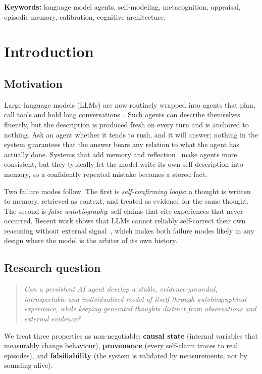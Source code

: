 \documentclass[11pt]{article}
\begin{document}
\vspace{4pt}\noindent\textbf{Keywords:} language model agents, self-modeling, metacognition, appraisal, episodic memory, calibration, cognitive architecture.

\section{Introduction}
\subsection{Motivation}
Large language models (LLMs) are now routinely wrapped into agents that plan, call tools and hold long conversations~\cite{yao2023react,sumers2023coala}. Such agents can describe themselves fluently, but the description is produced fresh on every turn and is anchored to nothing. Ask an agent whether it tends to rush, and it will answer; nothing in the system guarantees that the answer bears any relation to what the agent has actually done. Systems that add memory and reflection~\cite{park2023generative,shinn2023reflexion,packer2023memgpt} make agents more consistent, but they typically let the model write its own self-description into memory, so a confidently repeated mistake becomes a stored fact.

Two failure modes follow. The first is \emph{self-confirming loops}: a thought is written to memory, retrieved as context, and treated as evidence for the same thought. The second is \emph{false autobiography}: self-claims that cite experiences that never occurred. Recent work shows that LLMs cannot reliably self-correct their own reasoning without external signal~\cite{huang2024cannot}, which makes both failure modes likely in any design where the model is the arbiter of its own history.

\subsection{Research question}
\begin{quote}
\emph{Can a persistent AI agent develop a stable, evidence-grounded, introspectable and individualized model of itself through autobiographical experience, while keeping generated thoughts distinct from observations and external evidence?}
\end{quote}
We treat three properties as non-negotiable: \textbf{causal state} (internal variables that measurably change behaviour), \textbf{provenance} (every self-claim traces to real episodes), and \textbf{falsifiability} (the system is validated by measurements, not by sounding alive).
\end{document}
